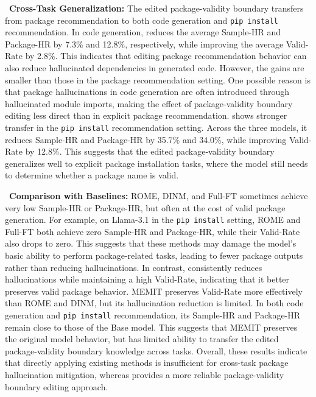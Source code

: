 \noindent\faHandORight~\textbf{Cross-Task Generalization:}
The edited package-validity boundary transfers from package recommendation to both code generation and \texttt{pip install} recommendation.
In code generation, \appname reduces the average Sample-HR and Package-HR by 7.3\% and 12.8\%, respectively, while improving the average Valid-Rate by 2.8\%.
This indicates that editing package recommendation behavior can also reduce hallucinated dependencies in generated code.
However, the gains are smaller than those in the package recommendation setting.
One possible reason is that package hallucinations in code generation are often introduced through hallucinated module imports, making the effect of package-validity boundary editing less direct than in explicit package recommendation.
\appname shows stronger transfer in the \texttt{pip install} recommendation setting.
Across the three models, it reduces Sample-HR and Package-HR by 35.7\% and 34.0\%, while improving Valid-Rate by 12.8\%.
This suggests that the edited package-validity boundary generalizes well to explicit package installation tasks, where the model still needs to determine whether a package name is valid.

\noindent\faHandORight~\textbf{Comparison with Baselines:}
ROME, DINM, and Full-FT sometimes achieve very low Sample-HR or Package-HR, but often at the cost of valid package generation. For example, on Llama-3.1 in the \texttt{pip install} setting, ROME and Full-FT both achieve zero Sample-HR and Package-HR, while their Valid-Rate also drops to zero. 
This suggests that these methods may damage the model's basic ability to perform package-related tasks, leading to fewer package outputs rather than reducing hallucinations.
In contrast, \appname consistently reduces hallucinations while maintaining a high Valid-Rate, indicating that it better preserves valid package behavior.
MEMIT preserves Valid-Rate more effectively than ROME and DINM, but its hallucination reduction is limited. In both code generation and \texttt{pip install} recommendation, its Sample-HR and Package-HR remain close to those of the Base model. This suggests that MEMIT preserves the original model behavior, but has limited ability to transfer the edited package-validity boundary knowledge across tasks.
Overall, these results indicate that directly applying existing methods is insufficient for cross-task package hallucination mitigation, whereas \appname provides a more reliable package-validity boundary editing approach.


